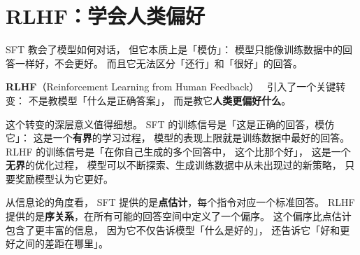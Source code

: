 \section{RLHF：学会人类偏好}

SFT 教会了模型如何对话，
但它本质上是「模仿」：
模型只能像训练数据中的回答一样好，不会更好。
而且它无法区分「还行」和「很好」的回答。

\textbf{RLHF}（Reinforcement Learning from Human Feedback）~\cite{ouyang2022rlhf}
引入了一个关键转变：
不是教模型「什么是正确答案」，
而是教它\textbf{人类更偏好什么}。

这个转变的深层意义值得细想。
SFT 的训练信号是「这是正确的回答，模仿它」：
这是一个\textbf{有界}的学习过程，
模型的表现上限就是训练数据中最好的回答。
RLHF 的训练信号是「在你自己生成的多个回答中，
这个比那个好」，
这是一个\textbf{无界}的优化过程，
模型可以不断探索、生成训练数据中从未出现过的新策略，
只要奖励模型认为它更好。

从信息论的角度看，
SFT 提供的是\textbf{点估计}，每个指令对应一个标准回答。
RLHF 提供的是\textbf{序关系}，在所有可能的回答空间中定义了一个偏序。
这个偏序比点估计包含了更丰富的信息，
因为它不仅告诉模型「什么是好的」，
还告诉它「好和更好之间的差距在哪里」。

